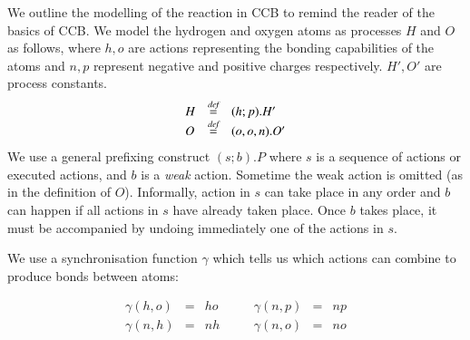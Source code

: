\documentclass[review]{elsarticle}
\newcommand{\bydef}{\stackrel{\emph{def}}{=}}
\begin{document}
We outline the modelling of the reaction in CCB to remind the reader of the basics of CCB. We model the hydrogen and oxygen atoms as processes $H$ and $O$ as follows, where 
$h,o$ are actions representing the bonding capabilities of the atoms and $n,p$ 
represent negative and positive charges respectively. $H',O'$ are process constants.
$$\begin{array}{lll}
H & \bydef & (h;p).H'\\
O & \bydef & (o,o,n).O'
\end{array}$$
We use a general prefixing construct $(s;b).P$ where $s$ is a sequence of actions or executed 
actions, and $b$ is a \emph{weak} action. Sometime the weak action is omitted 
(as in the definition of $O$). Informally, action in $s$ can take place in any order 
and $b$ can happen if
all actions in $s$ have already taken place. Once $b$ takes place, it must be accompanied by
undoing immediately one of the actions in $s$. 

We use a synchronisation function $\gamma$ which tells us which actions can combine to 
produce bonds between atoms:

$$\begin{array}{llllll}
\gamma(h,o) & = & ho \qquad &
\gamma(n,p) & = & np\\
\gamma(n,h) & = & nh &
\gamma(n,o) & = & no 
\end{array}$$
\end{document}
